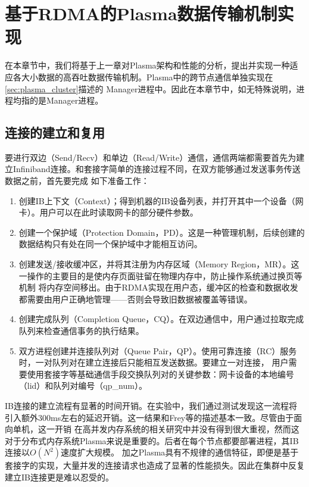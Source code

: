 \chapter{基于RDMA的Plasma数据传输机制实现}
\label{cha:implementation}

在本章节中，我们将基于上一章对Plasma架构和性能的分析，提出并实现一种适应各大小数据的高吞吐数据传输机制。Plasma中的跨节点通信单独实现在\autoref{sec:plasma_cluster}描述的
Manager进程中。因此在本章节中，如无特殊说明，进程均指的是Manager进程。

\section{连接的建立和复用}
\label{sec:ib_con}

要进行双边（Send/Recv）和单边（Read/Write）通信，通信两端都需要首先为建立Infiniband连接。和套接字简单的连接过程不同，在双方能够通过发送事务传送数据之前，首先要完成
如下准备工作：

\begin{enumerate}
	\item 创建IB上下文（Context）；得到机器的IB设备列表，并打开其中一个设备（网卡）。用户可以在此时读取网卡的部分硬件参数。
	\item 创建一个保护域（Protection Domain，PD）。这是一种管理机制，后续创建的数据结构只有处在同一个保护域中才能相互访问。
	\item 创建发送/接收缓冲区，并将其注册为内存区域（Memory Region，MR）。这一操作的主要目的是使内存页面驻留在物理内存中，防止操作系统通过换页等机制
	将内存空间移出。由于RDMA实现在用户态，缓冲区的检查和数据收发都需要由用户正确地管理——否则会导致旧数据被覆盖等错误。
	\item 创建完成队列（Completion Queue，CQ）。在双边通信中，用户通过拉取完成队列来检查通信事务的执行结果。
	\item 双方进程创建并连接队列对（Queue Pair，QP）。使用可靠连接（RC）服务时，一对队列对在建立连接后只能相互发送数据。要建立一对连接，
	用户需要使用套接字等基础通信手段交换队列对的关键参数：网卡设备的本地编号（lid）和队列对编号（qp\_num）。
\end{enumerate}

IB连接的建立流程有显著的时间开销。在实验中，我们通过测试发现这一流程将引入额外300ms左右的延迟开销。这一结果和Frey等\cite{frey2009minimizing}的描述基本一致。尽管由于面向单机，这一开销
在高并发内存系统的相关研究中并没有得到很大重视，然而这对于分布式内存系统Plasma来说是重要的。后者在每个节点都要部署进程，其IB连接以$O(N^2)$速度扩大规模。
加之Plasma具有不规律的通信特征，即便是基于套接字的实现，大量并发的连接请求也造成了显著的性能损失。因此在集群中反复建立IB连接更是难以忍受的。

